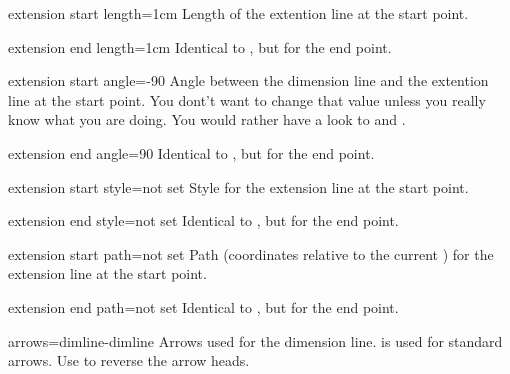 \documentclass[a4paper]{article}
\begin{document}
\begin{docKey}{extension start length}{=}{1cm}
  Length of the extention line at the start point.
\end{docKey}

\begin{docKey}{extension end length}{=}{1cm}
  Identical to , but for the end point.
\end{docKey}

\begin{docKey}{extension start angle}{=}{-90}
  Angle between the dimension line and the extention line at the start
  point.  You dont't want to change that value unless you really know what
  you are doing. You would rather have a look to  and .
\end{docKey}

\begin{docKey}{extension end angle}{=}{90}
  Identical to , but for the end point.
\end{docKey}

\begin{docKey}{extension start style}{=}{not set}
  Style for the extension line at the start point.
\end{docKey}

\begin{docKey}{extension end style}{=}{not set}
  Identical to , but for the end point.
\end{docKey}

\begin{docKey}{extension start path}{=}{not set}
  Path (coordinates relative to the current
  ) for the extension line at the start
  point.
\end{docKey}

\begin{docKey}{extension end path}{=}{not set}
  Identical to , but for the end point.
\end{docKey}


\begin{docKey}{arrows}{=}{dimline-dimline}
  Arrows used for the dimension line.  is used
  for standard arrows. Use  to
  reverse the arrow heads.
\end{docKey}
\end{document}

